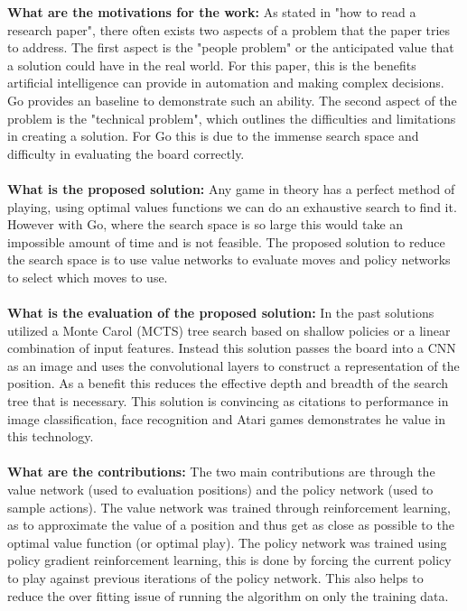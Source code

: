 \documentclass{article}
\begin{document}
\begin{titlepage}
\textbf{What are the motivations for the work:} As stated in "how to read a research paper", there often exists two aspects of a problem that the paper tries to address. The first aspect is the "people problem" or the anticipated value that a solution could have in the real world. For this paper, this is the benefits artificial intelligence can provide in automation and making complex decisions. Go provides an baseline to demonstrate such an ability. The second aspect of the problem is the "technical problem", which outlines the difficulties and limitations in creating a solution. For Go this is due to the immense search space and difficulty in evaluating the board correctly.\\\\

\textbf{What is the proposed solution:} Any game in theory has a perfect method of playing, using optimal values functions we can do an exhaustive search to find it. However with Go, where the search space is so large this would take an impossible amount of time and is not feasible. The proposed solution to reduce the search space is to use value networks to evaluate moves and policy networks to select which moves to use.  \\\\

\textbf{What is the evaluation of the proposed solution:} In the past solutions utilized a Monte Carol (MCTS) tree search based on shallow policies or a linear combination of input features. Instead this solution passes the board into a CNN as an image and uses the convolutional layers to construct a representation of the position. As a benefit this reduces the effective depth and breadth of the search tree that is necessary. This solution is convincing as citations to performance in image classification, face recognition and Atari games demonstrates he value in this technology. \\\\

\textbf{What are the contributions:} The two main contributions are through the value network (used to evaluation positions) and the policy network (used to sample actions). The value network was trained through reinforcement learning, as to approximate the value of a position  and thus get as close as possible to the optimal value function (or optimal play). The policy network was trained using policy gradient reinforcement learning, this is done by forcing the current policy to play against previous iterations of the policy network. This also helps to reduce the over fitting issue of running the algorithm on only the training data. \\\\


\end{titlepage}
\end{document}
